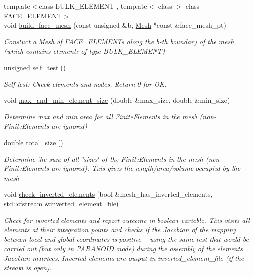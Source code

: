 \begin{DoxyCompactItemize}
{\footnotesize template$<$class B\+U\+L\+K\+\_\+\+E\+L\+E\+M\+E\+NT , template$<$ class $>$ class F\+A\+C\+E\+\_\+\+E\+L\+E\+M\+E\+NT$>$ }\\void \hyperlink{classoomph_1_1Mesh_a93e1758501aeea3328291571ce501029}{build\+\_\+face\+\_\+mesh} (const unsigned \&b, \hyperlink{classoomph_1_1Mesh}{Mesh} $\ast$const \&face\+\_\+mesh\+\_\+pt)
\begin{DoxyCompactList}\small\item\em Constuct a \hyperlink{classoomph_1_1Mesh}{Mesh} of F\+A\+C\+E\+\_\+\+E\+L\+E\+M\+E\+N\+Ts along the b-\/th boundary of the mesh (which contains elements of type B\+U\+L\+K\+\_\+\+E\+L\+E\+M\+E\+NT) \end{DoxyCompactList}\item 
unsigned \hyperlink{classoomph_1_1Mesh_ac713e5a9cbd8b21907d39df493d6bfc9}{self\+\_\+test} ()
\begin{DoxyCompactList}\small\item\em Self-\/test\+: Check elements and nodes. Return 0 for OK. \end{DoxyCompactList}\item 
void \hyperlink{classoomph_1_1Mesh_a20579c8d8f8b6e6ca2d2e897a67fda68}{max\+\_\+and\+\_\+min\+\_\+element\+\_\+size} (double \&max\+\_\+size, double \&min\+\_\+size)
\begin{DoxyCompactList}\small\item\em Determine max and min area for all Finite\+Elements in the mesh (non-\/\+Finite\+Elements are ignored) \end{DoxyCompactList}\item 
double \hyperlink{classoomph_1_1Mesh_afa4aa3d2d41bd2a5a40ce4cffc9e2952}{total\+\_\+size} ()
\begin{DoxyCompactList}\small\item\em Determine the sum of all \char`\"{}sizes\char`\"{} of the Finite\+Elements in the mesh (non-\/\+Finite\+Elements are ignored). This gives the length/area/volume occupied by the mesh. \end{DoxyCompactList}\item 
void \hyperlink{classoomph_1_1Mesh_a76adc3fcd3e49d3bd2e3b9d92c854430}{check\+\_\+inverted\+\_\+elements} (bool \&mesh\+\_\+has\+\_\+inverted\+\_\+elements, std\+::ofstream \&inverted\+\_\+element\+\_\+file)
\begin{DoxyCompactList}\small\item\em Check for inverted elements and report outcome in boolean variable. This visits all elements at their integration points and checks if the Jacobian of the mapping between local and global coordinates is positive -- using the same test that would be carried out (but only in P\+A\+R\+A\+N\+O\+ID mode) during the assembly of the elements\textquotesingle{} Jacobian matrices. Inverted elements are output in inverted\+\_\+element\+\_\+file (if the stream is open). \end{DoxyCompactList}\item 

\end{DoxyCompactItemize}
